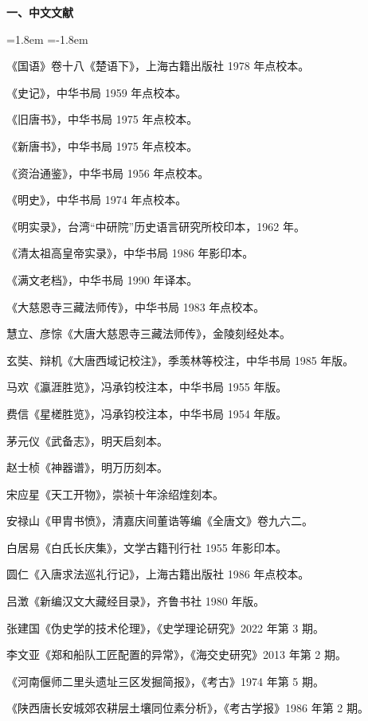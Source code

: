 \noindent\textbf{一、中文文献}\par
\vspace{2mm}
\begin{list}{}{\leftmargin=1.8em \itemindent=-1.8em \topsep=0pt \parsep=1.4pt \itemsep=0pt}
\item 《国语》卷十八《楚语下》，上海古籍出版社 1978 年点校本。
\item 《史记》，中华书局 1959 年点校本。
\item 《旧唐书》，中华书局 1975 年点校本。
\item 《新唐书》，中华书局 1975 年点校本。
\item 《资治通鉴》，中华书局 1956 年点校本。
\item 《明史》，中华书局 1974 年点校本。
\item 《明实录》，台湾“中研院”历史语言研究所校印本，1962 年。
\item 《清太祖高皇帝实录》，中华书局 1986 年影印本。
\item 《满文老档》，中华书局 1990 年译本。
\item 《大慈恩寺三藏法师传》，中华书局 1983 年点校本。
\item 慧立、彦悰《大唐大慈恩寺三藏法师传》，金陵刻经处本。
\item 玄奘、辩机《大唐西域记校注》，季羡林等校注，中华书局 1985 年版。
\item 马欢《瀛涯胜览》，冯承钧校注本，中华书局 1955 年版。
\item 费信《星槎胜览》，冯承钧校注本，中华书局 1954 年版。
\item 茅元仪《武备志》，明天启刻本。
\item 赵士桢《神器谱》，明万历刻本。
\item 宋应星《天工开物》，崇祯十年涂绍煃刻本。
\item 安禄山《甲胄书愤》，清嘉庆间董诰等编《全唐文》卷九六二。
\item 白居易《白氏长庆集》，文学古籍刊行社 1955 年影印本。
\item 圆仁《入唐求法巡礼行记》，上海古籍出版社 1986 年点校本。
\item 吕澂《新编汉文大藏经目录》，齐鲁书社 1980 年版。
\item 张建国《伪史学的技术伦理》，《史学理论研究》2022 年第 3 期。
\item 李文亚《郑和船队工匠配置的异常》，《海交史研究》2013 年第 2 期。
\item 《河南偃师二里头遗址三区发掘简报》，《考古》1974 年第 5 期。
\item 《陕西唐长安城郊农耕层土壤同位素分析》，《考古学报》1986 年第 2 期。
\end{list}

